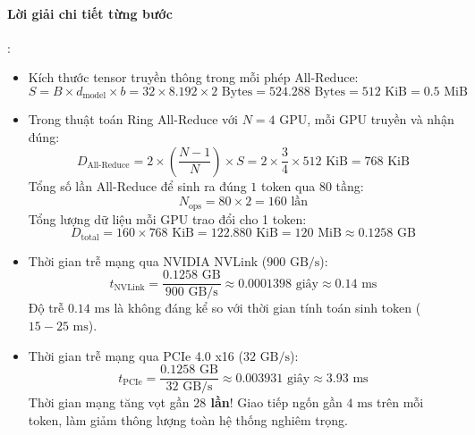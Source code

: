 \paragraph{Lời giải chi tiết từng bước}:
\begin{itemize}
  \item[1)] Kích thước tensor truyền thông trong mỗi phép All-Reduce:
  \begin{equation*}
  S = B \times d_{\text{model}} \times b = 32 \times 8.192 \times 2\text{ Bytes} = 524.288\text{ Bytes} = 512\text{ KiB} = 0.5\text{ MiB}
  \end{equation*}

  \item[2)] Trong thuật toán Ring All-Reduce với $N = 4$ GPU, mỗi GPU truyền và nhận đúng:
  \begin{equation*}
  D_{\text{All-Reduce}} = 2 \times \left( \frac{N - 1}{N} \right) \times S = 2 \times \frac{3}{4} \times 512\text{ KiB} = 768\text{ KiB}
  \end{equation*}
  Tổng số lần All-Reduce để sinh ra đúng $1$ token qua 80 tầng:
  \begin{equation*}
  N_{\text{ops}} = 80 \times 2 = 160\text{ lần}
  \end{equation*}
  Tổng lượng dữ liệu mỗi GPU trao đổi cho 1 token:
  \begin{equation*}
  D_{\text{total}} = 160 \times 768\text{ KiB} = 122.880\text{ KiB} = 120\text{ MiB} \approx 0.1258\text{ GB}
  \end{equation*}

  \item[3)] Thời gian trễ mạng qua NVIDIA NVLink ($900\text{ GB/s}$):
  \begin{equation*}
  t_{\text{NVLink}} = \frac{0.1258\text{ GB}}{900\text{ GB/s}} \approx 0.0001398\text{ giây} \approx 0.14\text{ ms}
  \end{equation*}
  Độ trễ $0.14\text{ ms}$ là không đáng kể so với thời gian tính toán sinh token ($15 - 25\text{ ms}$).

  \item[4)] Thời gian trễ mạng qua PCIe 4.0 x16 ($32\text{ GB/s}$):
  \begin{equation*}
  t_{\text{PCIe}} = \frac{0.1258\text{ GB}}{32\text{ GB/s}} \approx 0.003931\text{ giây} \approx 3.93\text{ ms}
  \end{equation*}
  Thời gian mạng tăng vọt gần \textbf{$28$ lần}! Giao tiếp ngốn gần $4\text{ ms}$ trên mỗi token, làm giảm thông lượng toàn hệ thống nghiêm trọng.
\end{itemize}

